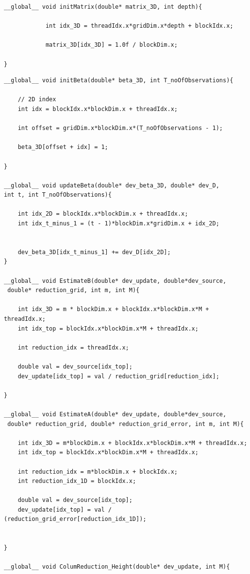\documentclass[english, paper=a4]{scrartcl}
\begin{document}
\begin{verbatim}
__global__ void initMatrix(double* matrix_3D, int depth){

			int idx_3D = threadIdx.x*gridDim.x*depth + blockIdx.x;

			matrix_3D[idx_3D] = 1.0f / blockDim.x;

}
\end{verbatim}

\begin{verbatim}
__global__ void initBeta(double* beta_3D, int T_noOfObservations){

	// 2D index
	int idx = blockIdx.x*blockDim.x + threadIdx.x;

	int offset = gridDim.x*blockDim.x*(T_noOfObservations - 1);

	beta_3D[offset + idx] = 1;

}

__global__ void updateBeta(double* dev_beta_3D, double* dev_D, 
int t, int T_noOfObservations){

	int idx_2D = blockIdx.x*blockDim.x + threadIdx.x;
	int idx_t_minus_1 = (t - 1)*blockDim.x*gridDim.x + idx_2D;


	dev_beta_3D[idx_t_minus_1] += dev_D[idx_2D];
}

__global__ void EstimateB(double* dev_update, double*dev_source,
 double* reduction_grid, int m, int M){

	int idx_3D = m * blockDim.x + blockIdx.x*blockDim.x*M + threadIdx.x;
	int idx_top = blockIdx.x*blockDim.x*M + threadIdx.x;

	int reduction_idx = threadIdx.x;

	double val = dev_source[idx_top];
	dev_update[idx_top] = val / reduction_grid[reduction_idx];

}

__global__ void EstimateA(double* dev_update, double*dev_source,
 double* reduction_grid, double* reduction_grid_error, int m, int M){

	int idx_3D = m*blockDim.x + blockIdx.x*blockDim.x*M + threadIdx.x;
	int idx_top = blockIdx.x*blockDim.x*M + threadIdx.x;

	int reduction_idx = m*blockDim.x + blockIdx.x;
	int reduction_idx_1D = blockIdx.x;

	double val = dev_source[idx_top];
	dev_update[idx_top] = val / (reduction_grid_error[reduction_idx_1D]);


}

__global__ void ColumReduction_Height(double* dev_update, int M){


\end{verbatim}
\end{document}
